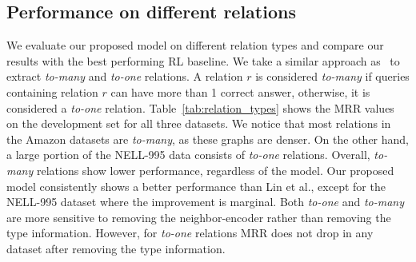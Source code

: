 \subsection{Performance on different relations}
We evaluate our proposed model on different relation types and compare our results with the best performing RL baseline. We take a similar approach as~\cite{lin2018multi} to extract \textit{to-many} and \textit{to-one} relations. A relation $r$ is considered \textit{to-many} if queries containing relation $r$ can have more than 1 correct answer, otherwise, it is considered a \textit{to-one} relation. Table~\ref{tab:relation_types} shows the MRR values on the development set for all three datasets. We notice that most relations in the Amazon datasets are \textit{to-many}, as these graphs are denser. On the other hand, a large portion of the NELL-995 data consists of \textit{to-one} relations. Overall, \textit{to-many} relations show lower performance, regardless of the model. Our proposed model consistently shows a better performance than Lin et al., except for the NELL-995 dataset where the improvement is marginal. Both \textit{to-one} and \textit{to-many} are more sensitive to removing the neighbor-encoder rather than removing the type information. However, for \textit{to-one} relations MRR does not drop in any dataset after removing the type information. 


